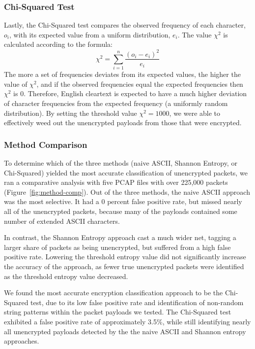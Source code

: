 \subsubsection{Chi-Squared Test}
Lastly, the Chi-Squared test compares the observed frequency of each character, $o_i$, with its expected value from a uniform distribution, $e_i$. The value $\chi^2$ is calculated according to the formula:
$$\chi^2 = \sum_{i=1}^{n} \frac{(o_i-e_i)^2}{e_i}$$
The more a set of frequencies deviates from its expected values, the higher the value of $\chi^2$, and if the observed frequencies equal the expected frequencies then $\chi^2$ is 0. Therefore, English cleartext is expected to have a much higher deviation of character frequencies from the expected frequency (a uniformly random distribution). By setting the threshold value $\chi^2 = 1000$, we were able to effectively weed out the unencrypted payloads from those that were encrypted. 

\subsubsection{Method Comparison}

To determine which of the three methods (naive ASCII, Shannon Entropy, or Chi-Squared)
yielded the most accurate classification of unencrypted packets, we ran a comparative analysis with five PCAP files with over 225,000 packets (Figure~\ref{fig:method-comp}). Out of the three methods, the naive ASCII approach was the most selective. It had a 0 percent false positive rate, but missed nearly all of the unencrypted packets, because many of the payloads contained some number of extended ASCII characters. 

In contrast, the Shannon Entropy approach cast a much wider net, tagging a larger share of packets as being unencrypted, but suffered from a high false positive rate. Lowering the threshold entropy value did not significantly increase the accuracy of the approach, as fewer true unencrypted packets were identified as the threshold entropy value decreased. 

We found the most accurate encryption classification approach to be the Chi-Squared
test, due to its low false positive rate and identification of non-random string patterns within the packet payloads we tested. The Chi-Squared test exhibited a false positive rate of approximately 3.5\%, while still identifying nearly all unencrypted payloads detected by the the naive ASCII and Shannon entropy approaches.


